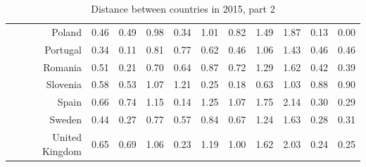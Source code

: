 \documentclass[a4paper,twoside,10pt]{article}
\begin{document}
\begin{table}[ht]
\begin{tabular}{r|rrrrrrrrrr}
			Poland & 0.46 & 0.49 & 0.98 & 0.34 & 1.01 & 0.82 & 1.49 & 1.87 & 0.13 & 0.00 \\
			Portugal & 0.34 & 0.11 & 0.81 & 0.77 & 0.62 & 0.46 & 1.06 & 1.43 & 0.46 & 0.46 \\
			Romania & 0.51 & 0.21 & 0.70 & 0.64 & 0.87 & 0.72 & 1.29 & 1.62 & 0.42 & 0.39 \\
			Slovenia & 0.58 & 0.53 & 1.07 & 1.21 & 0.25 & 0.18 & 0.63 & 1.03 & 0.88 & 0.90 \\
			Spain & 0.66 & 0.74 & 1.15 & 0.14 & 1.25 & 1.07 & 1.75 & 2.14 & 0.30 & 0.29 \\
			Sweden & 0.44 & 0.27 & 0.77 & 0.57 & 0.84 & 0.67 & 1.24 & 1.63 & 0.28 & 0.31 \\
			United Kingdom & 0.65 & 0.69 & 1.06 & 0.23 & 1.19 & 1.00 & 1.62 & 2.03 & 0.24 & 0.25 \\
			\hline
		\end{tabular}
		\caption{Distance between countries in 2015, part 2}
		\label{tab:distance_2015}
	\end{table}
	
\end{document}
